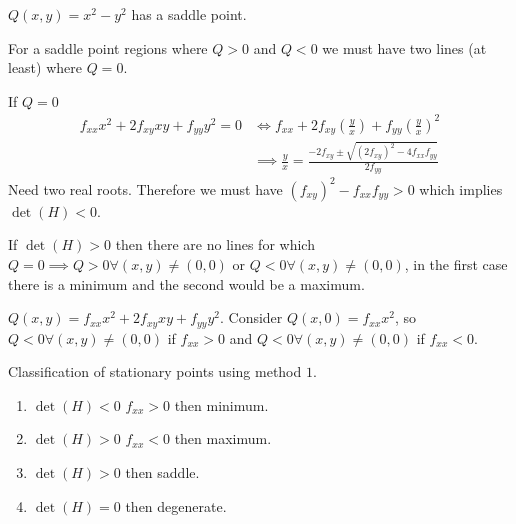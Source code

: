 \documentclass[10pt, a4paper]{article}
\begin{document}
\begin{example}
    $Q(x, y) = x ^ 2 - y ^ 2$ has a saddle point.
\end{example}

For a saddle point regions where $Q > 0$ and $Q < 0$ we must have two lines
(at least)
where $Q = 0$.

If $Q = 0$
\begin{align*}
    f_{xx}x ^ 2 + 2f_{xy}xy + f_{yy}y ^ 2 = 0 &\iff f_{xx} + 2f_{xy}\left(\frac{y}{x}\right) + f_{yy}\left(\frac{y}{x}\right) ^ 2 \\
    &\implies \frac{y}{x} = \frac{-2f_{xy} \pm \sqrt{(2f_{xy}) ^ 2 - 4f_{xx}f_{yy}}}{2f_{yy}}
\end{align*}
Need two real roots.
Therefore we must have $(f_{xy}) ^ 2 - f_{xx}f_{yy} > 0$ which implies $\det(H) < 0$.

If $\det(H) > 0$ then there are no lines for which $Q = 0 \implies Q > 0 \forall (x, y) \neq (0, 0) \text{ or } Q < 0 \forall (x, y) \neq (0, 0)$,
in the first case there is a minimum and the second would be a maximum.

$Q(x, y) = f_{xx}x ^ 2 + 2f_{xy}xy + f_{yy}y ^ 2$.
Consider $Q(x, 0) = f_{xx}x ^ 2$,
so $Q < 0 \forall (x, y) \neq (0, 0)$ if $f_{xx} > 0$ and $Q < 0 \forall (x, y) \neq (0, 0)$ if $f_{xx} < 0$.

Classification of stationary points using method $1$.
\begin{enumerate}[label = \arabic*.]
    \item $\det(H) < 0$ $f_{xx} > 0$ then minimum.
    
    \item $\det(H) > 0$ $f_{xx} < 0$ then maximum.
    
    \item $\det(H) > 0$ then saddle.

    \item $\det(H) = 0$ then degenerate.
\end{enumerate}
\end{document}

